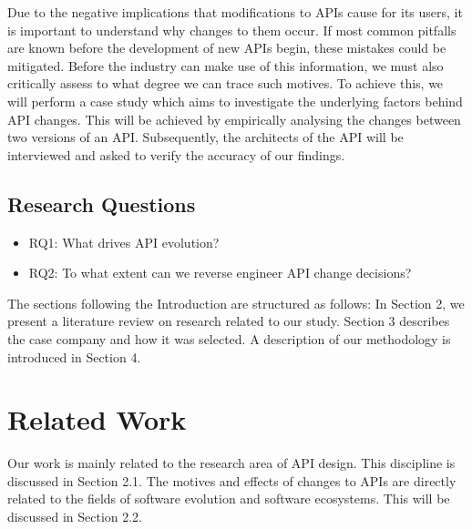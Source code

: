 \documentclass[10pt,twocolumn]{article}
\begin{document}
Due to the negative implications that modifications to APIs cause for its users, it is important to understand why changes to them occur. If most common pitfalls are known before the development of new APIs begin, these mistakes could be mitigated. Before the industry can make use of this information, we must also critically assess to what degree we can trace such motives. To achieve this, we will perform a case study which aims to investigate the underlying factors behind API changes. This will be achieved by empirically analysing the changes between two versions of an API. Subsequently, the architects of the API will be interviewed and asked to verify the accuracy of our findings. 



\subsection{Research Questions}
\begin{itemize}
\item RQ1: What drives API evolution? 
\item RQ2: To what extent can we reverse engineer API change decisions?
\end{itemize}

The sections following the Introduction are structured as follows: In Section 2, we present a literature review on research related to our study. Section 3 describes the case company and how it was selected. A description of our methodology is introduced in Section 4. 

\section{Related Work}
Our work is mainly related to the research area of API design. This discipline is discussed in Section 2.1. The motives and effects of changes to APIs are directly related to the fields of software evolution and software ecosystems. This will be discussed in Section 2.2. 
\end{document}
